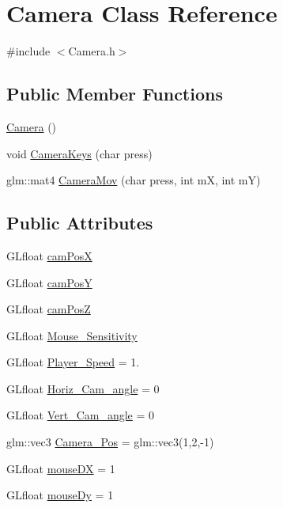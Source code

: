 \hypertarget{class_camera}{}\section{Camera Class Reference}
\label{class_camera}


{\ttfamily \#include $<$Camera.\+h$>$}

\subsection*{Public Member Functions}
\begin{DoxyCompactItemize}
\item 
\hyperlink{class_camera_a01f94c3543f56ede7af49dc778f19331}{Camera} ()
\item 
void \hyperlink{class_camera_ae97e22115cee81d2901119faa9d23f38}{Camera\+Keys} (char press)
\item 
glm\+::mat4 \hyperlink{class_camera_a281099a5ab2f325847dca08eefcc140c}{Camera\+Mov} (char press, int m\+X, int m\+Y)
\end{DoxyCompactItemize}
\subsection*{Public Attributes}
\begin{DoxyCompactItemize}
\item 
G\+Lfloat \hyperlink{class_camera_a6acfd236911f7f867ba2993f59a22fa4}{cam\+Pos\+X}
\item 
G\+Lfloat \hyperlink{class_camera_adeb153325cb42a77c6114ab597c69cfa}{cam\+Pos\+Y}
\item 
G\+Lfloat \hyperlink{class_camera_a4fbae1f797ffb17794d38b2aea4bcc48}{cam\+Pos\+Z}
\item 
G\+Lfloat \hyperlink{class_camera_ada530cf7b97b15431c729ddc3435d702}{Mouse\+\_\+\+Sensitivity}
\item 
G\+Lfloat \hyperlink{class_camera_ab20174a89f86b685216dfe825e9ce95d}{Player\+\_\+\+Speed} = 1.
\item 
G\+Lfloat \hyperlink{class_camera_a6d9ee75d6ad778196e1083dd5a0167ad}{Horiz\+\_\+\+Cam\+\_\+angle} = 0
\item 
G\+Lfloat \hyperlink{class_camera_a2b4d70e845ce688971b9ae32cf47dc45}{Vert\+\_\+\+Cam\+\_\+angle} = 0
\item 
glm\+::vec3 \hyperlink{class_camera_abc7eb4129b1e04323354ab456b441348}{Camera\+\_\+\+Pos} = glm\+::vec3(1,2,-\/1)
\item 
G\+Lfloat \hyperlink{class_camera_abc15ba4d62277f3f995127bb5d41517f}{mouse\+D\+X} = 1
\item 
G\+Lfloat \hyperlink{class_camera_aeee67efd9e51edc7f3bc372c4d323753}{mouse\+Dy} = 1
\end{DoxyCompactItemize}


